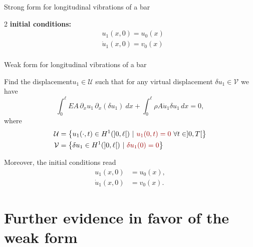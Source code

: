 \documentclass[aspectratio=169]{beamer}
\begin{document}
{\begin{frame}{Strong form for longitudinal vibrations of a bar}
\begin{block}{}
\begin{multicols}{2}
        \textbf{initial conditions:}
        \[
          \begin{aligned}
             & u_1(x, 0) =  u_0(x)      \\
             & \dot{u}_1(x, 0) = v_0(x) \\
          \end{aligned}
        \]
      \end{multicols}
      \vspace{0.01cm}
    \end{block}
  \end{frame}



  \begin{frame}{Weak form for longitudinal vibrations of a bar}
    \begin{block}{}
      Find the displacement$u_{1}\in \mathcal U$ such that for any virtual displacement $\delta u_1\in\mathcal V$ we have
      \[
        \int_0^\ell EA\, \partial_{x} u_1\,\partial_{x}(\delta u_1)\ dx +\int_0^\ell\rho A \ddot{u}_1\delta u_1\, dx=0,
      \]
      where
      \begin{align*}
        \mathcal U & =\big\{u_{1}(\cdot,t)\in H^1(]0,\ell[)\ |\   {\color{darkred}u_1(0,t)=0}\ \forall t\in]0,T[\big\} \\
        \mathcal V & =\big\{\delta u_{1}\in H^1(]0,\ell[)\ |\  {\color{darkred}\delta u_{1}(0)=0}\big\}
      \end{align*}
    \end{block}
    Moreover, the initial conditions read
    $$\begin{aligned}
        u_1(x,0)      & = u_0(x), \\
        \dot u_1(x,0) & = v_0(x).
      \end{aligned}$$
  \end{frame}
 }

\section{Further evidence in favor of the weak form}
\end{document}
